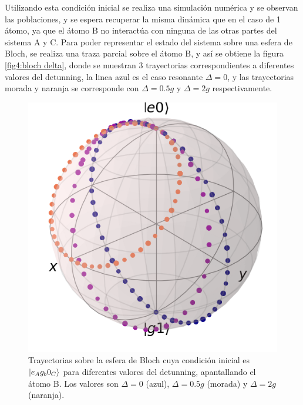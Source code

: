 Utilizando esta condición inicial se realiza una simulación numérica y se observan las poblaciones, y se espera recuperar la misma dinámica que en el caso de 1 átomo, ya que el átomo B no interactúa con ninguna de las otras partes del sistema A y C. Para poder representar el estado del sistema sobre una esfera de Bloch, se realiza una traza parcial sobre el átomo B, y así se obtiene la figura \ref{fig4:bloch delta}, donde se muestran 3 trayectorias correspondientes a diferentes valores del detunning, la linea azul es el caso resonante $\Delta=0$, y las trayectorias morada y naranja se corresponde con $\Delta=0.5g$ y $\Delta=2g$ respectivamente.
\begin{figure}[H]
    \begin{minipage}[c]{0.67\textwidth}
        \includegraphics[width=\textwidth]{figuras/ch4/bloch eg0 bloch AC a=0 d=2.0 x=0.0 k=0.0 J=0.0 gamma=0.0 p=0.0.png}
    \end{minipage}\hfill
    \begin{minipage}[c]{0.3\textwidth}
        \caption{Trayectorias sobre la esfera de Bloch cuya condición inicial es $\ket{e_Ag_b0_C}$ para diferentes valores del detunning, apantallando el átomo B. Los valores son $\Delta=0$ (azul), $\Delta=0.5g$ (morada) y $\Delta=2g$ (naranja).}
        \label{fig4:bloch delta eg0}
    \end{minipage}
\end{figure}

